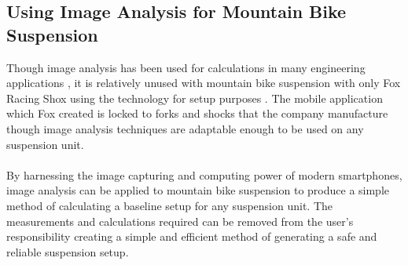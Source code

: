 \subsection{Using Image Analysis for Mountain Bike Suspension}
Though image analysis has been used for calculations in many engineering 
applications \citep{concreteanalysis, bridgecables}, it is relatively unused 
with mountain bike suspension with only Fox Racing Shox using the technology 
for setup purposes \citep{foxird}. The mobile application which Fox created is 
locked to \glspl{fork} and \glspl{shock} that the company manufacture though  
image analysis techniques are adaptable enough to be used on any suspension 
unit.
\\\\
By harnessing the image capturing and computing power of modern smartphones, 
image analysis can be applied to mountain bike suspension to produce a simple 
method of calculating a baseline setup for any suspension unit. The 
measurements and calculations required can be removed from the user's 
responsibility creating a simple and efficient method of generating a safe and 
reliable suspension setup.